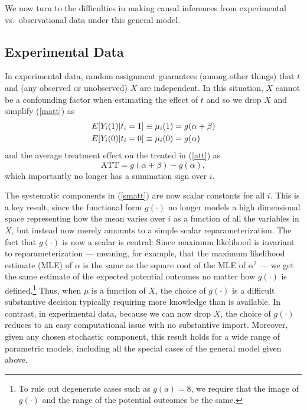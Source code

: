 \documentclass[11pt,titlepage]{article}
\begin{document}
We now turn to the difficulties in making causal inferences from
experimental vs.\ observational data under this general model.

\subsection{Experimental Data}\label{s:paraexp}

In experimental data, random assignment guarantees (among other
things) that $t$ and (any observed or unobserved) $X$ are independent.
In this situation, $X$ cannot be a confounding factor when estimating
the effect of $t$ and so we drop $X$ and simplify (\ref{matt}) as
\begin{align}
  \label{smatt}
  E[Y_i(1)|t_i=1] &\equiv \mu_i(1) = g(\alpha + \beta)\notag \\
  E[Y_i(0)|t_i=0] &\equiv \mu_i(0) = g(\alpha)
\end{align}
and the average treatment effect on the treated in (\ref{att}) as
\begin{equation}
  \label{satt}
  \text{ATT} = g(\alpha+\beta) - g(\alpha),
\end{equation}
which importantly no longer has a summation sign over $i$.

The systematic components in (\ref{smatt}) are now scalar constants
for all $i$.  This is a key result, since the functional form
$g(\cdot)$ no longer models a high dimensional space representing how
the mean varies over $i$ as a function of all the variables in $X$,
but instead now merely amounts to a simple scalar reparameterization.
The fact that $g(\cdot)$ is now a scalar is central: Since maximum
likelihood is invariant to reparameterization --- meaning, for
example, that the maximum likelihood estimate (MLE) of $\alpha$ is the
same as the square root of the MLE of $\alpha^2$
\citep[][p.75--76]{King89} --- we get the same estimate of the
expected potential outcomes no matter how $g(\cdot)$ is
defined.\footnote{To rule out degenerate cases such as $g(a)=8$, we
  require that the image of $g(\cdot)$ and the range of the potential
  outcomes be the same.}  Thus, when $\mu$ is a function of $X$, the
choice of $g(\cdot)$ is a difficult substantive decision typically
requiring more knowledge than is available.  In contrast, in
experimental data, because we can now drop $X$, the choice of
$g(\cdot)$ reduces to an easy computational issue with no substantive
import.  Moreover, given any chosen stochastic component, this result
holds for a wide range of parametric models, including all the special
cases of the general model given above.
\end{document}
